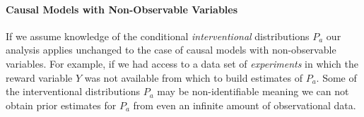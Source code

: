\paragraph{Causal Models with Non-Observable Variables}
If we assume knowledge of the conditional \textit{interventional} distributions $P_a$ our analysis applies unchanged to the case of causal models with non-observable variables. For example, if we had access to a data set of \textit{experiments} in which the reward variable $Y$ was not available from which to build estimates of $P_a$. Some of the interventional distributions $P_a$ may be non-identifiable meaning we can not obtain prior estimates for $P_a$ from even an infinite amount of observational data. 






